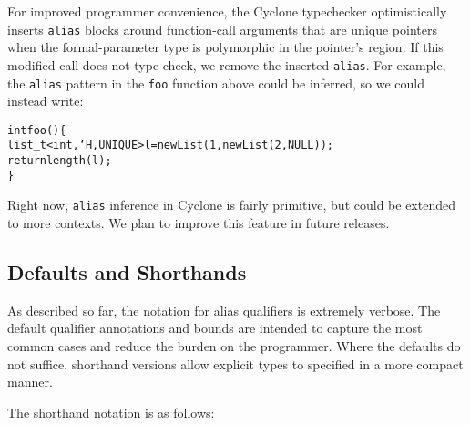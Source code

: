 

For improved programmer convenience, the Cyclone typechecker
optimistically inserts \texttt{alias} blocks around function-call
arguments that are unique pointers when the formal-parameter type is
polymorphic in the pointer's region.  If this modified call does not
type-check, we remove the inserted \texttt{alias}.  For example, the
\texttt{alias} pattern in the \texttt{foo} function above could be
inferred, so we could instead write:
\begin{alltt}
  int foo() \{
    list\_t<int,`H,UNIQUE> l = new List(1,new List(2,NULL));
    return length(l);
  \}
\end{alltt}
Right now, \texttt{alias} inference in Cyclone is fairly primitive,
but could be extended to more contexts.  We plan to improve this
feature in future releases.

\subsection{Defaults and Shorthands}

As described so far, the notation for alias qualifiers is extremely
verbose. The default qualifier annotations and bounds are intended to
capture the most common cases and reduce the burden on the
programmer. Where the defaults do not suffice, shorthand versions
allow explicit types to specified in a more compact manner. 

The shorthand notation is as follows:

